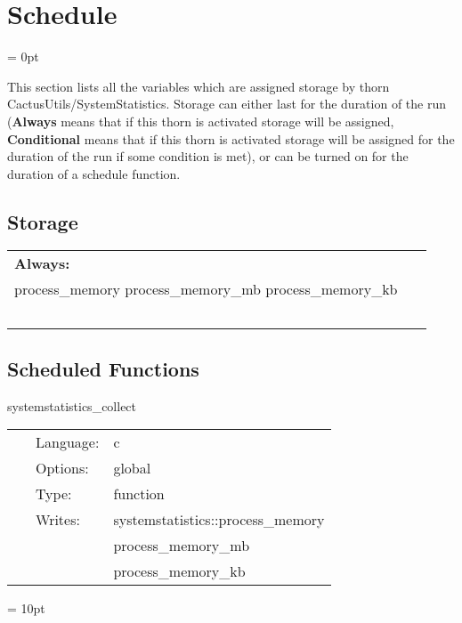 
\section{Schedule} 


\parskip = 0pt


\noindent This section lists all the variables which are assigned storage by thorn CactusUtils/SystemStatistics.  Storage can either last for the duration of the run ({\bf Always} means that if this thorn is activated storage will be assigned, {\bf Conditional} means that if this thorn is activated storage will be assigned for the duration of the run if some condition is met), or can be turned on for the duration of a schedule function.


\subsection*{Storage}

\hspace{5mm}

 \begin{tabular*}{160mm}{ll} 

{\bf Always:}&  ~ \\ 
 process\_memory process\_memory\_mb process\_memory\_kb & ~\\ 
~ & ~\\ 
\end{tabular*} 


\subsection*{Scheduled Functions}
\vspace{5mm}


\hspace{5mm} systemstatistics\_collect 

\hspace{5mm}{\it collect system statistics } 


\hspace{5mm}

 \begin{tabular*}{160mm}{cll} 
~ & Language:  & c \\ 
~ & Options:  & global \\ 
~ & Type:  & function \\ 
~ & Writes:  & systemstatistics::process\_memory \\ 
~& ~ &process\_memory\_mb\\ 
~& ~ &process\_memory\_kb\\ 
\end{tabular*} 



\vspace{5mm}\parskip = 10pt 
